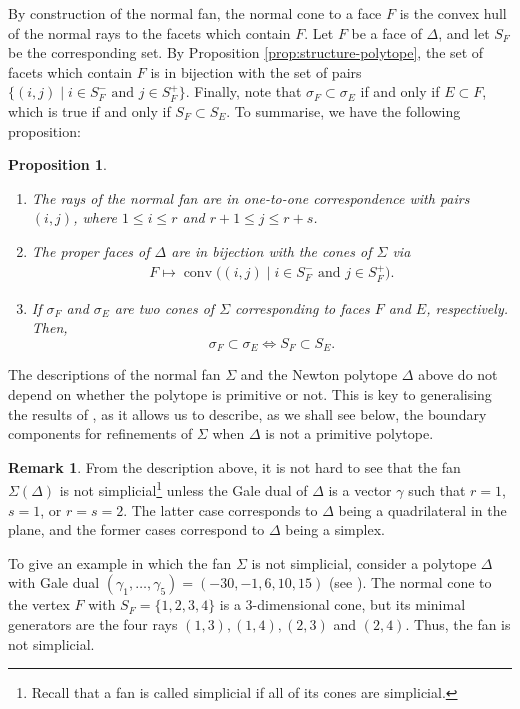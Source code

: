 \documentclass[11pt, reqno]{amsart}
\theoremstyle{plain}
\newtheorem{prop}[theo]{Proposition}
\theoremstyle{definition}
\newtheorem{rem}[theo]{Remark}
\newcommand{\ga}{\gamma}
\begin{document}
By construction of the normal fan, the normal cone to a face $F$ is the convex hull of the normal rays to the facets which contain $F$. 
Let $F$ be a face of $\Delta$, and let $S_F$ be the corresponding set.
By Proposition \ref{prop:structure-polytope}, the set of facets which contain $F$ is in bijection with the set of pairs $\{ (i,j) \mid i \in S_F^{-} \text{ and } j \in S_F^{+}\}$. 
Finally, note that $ \sigma_F \subset \sigma_E$ if and only if  $E \subset F$, which is true if and only if $S_F \subset S_E$. To summarise, we have the following proposition:
\begin{prop}\label{prop:normal-fan} \hfill
\begin{enumerate}
    \item The rays of the normal fan are in one-to-one correspondence with pairs $(i,j)$, where $1 \le i \le r$ and $r+1 \le j \le r+s$. 
    \item The proper faces of $\Delta$ are in bijection with the cones of $\Sigma$ via
    \begin{align*}
        F \mapsto \operatorname{conv} \big( (i,j) \mid i \in S_F^{-} \text{ and } j \in S_F^{+} \big).
    \end{align*}
    \item If $\sigma_F$ and $\sigma_E$ are two cones of $\Sigma$ corresponding to faces $F$ and $E$, respectively. Then,
    \[
    \sigma_F \subset \sigma_E \iff S_F \subset S_E.
    \] 
\end{enumerate}
\end{prop}

  The descriptions of the normal fan $\Sigma$ and the Newton polytope $\Delta$ above do not depend on whether the polytope is primitive or not. This is key to generalising the results of \cite{BCM}, as it allows us to describe, as we shall see below, the boundary components for refinements of $\Sigma$ when $\Delta$ is not a primitive polytope. 

\begin{rem}
From the description above, it is not hard to see that the fan $\Sigma(\Delta)$ is not simplicial\footnote{Recall that a fan is called simplicial if all of its cones are simplicial.} unless the Gale dual of $\Delta$ is a vector $\gamma$ such that $r=1$, $s=1$, or $r=s=2$. 
The latter case corresponds to $\Delta$ being a quadrilateral in the plane, and the former cases correspond to $\Delta$ being a simplex. 

To give an example in which the fan $\Sigma$ is not simplicial, consider a polytope $\Delta$ with Gale dual $(\ga_1,\dots,\ga_{5})=(-30,-1,6,10,15)$ (see \cite[\S 3]{villegas-integral-factorial}).
The normal cone to the vertex $F$ with $S_F= \{1,2,3,4\}$ is a $3$-dimensional cone, but its minimal generators are the four rays $(1,3),(1,4),(2,3)$ and $(2,4)$. Thus, the fan is not simplicial.
\end{rem}
\end{document}
